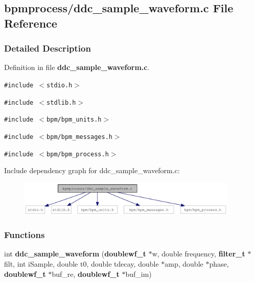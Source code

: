 \subsection{bpmprocess/ddc\_\-sample\_\-waveform.c File Reference}
\label{ddc__sample__waveform_8c}


\subsubsection{Detailed Description}


Definition in file {\bf ddc\_\-sample\_\-waveform.c}.

{\tt \#include $<$stdio.h$>$}\par
{\tt \#include $<$stdlib.h$>$}\par
{\tt \#include $<$bpm/bpm\_\-units.h$>$}\par
{\tt \#include $<$bpm/bpm\_\-messages.h$>$}\par
{\tt \#include $<$bpm/bpm\_\-process.h$>$}\par


Include dependency graph for ddc\_\-sample\_\-waveform.c:\nopagebreak
\begin{figure}[H]
\begin{center}
\leavevmode
\includegraphics[width=297pt]{ddc__sample__waveform_8c__incl}
\end{center}
\end{figure}
\subsubsection*{Functions}
\begin{CompactItemize}
\item 
int {\bf ddc\_\-sample\_\-waveform} ({\bf doublewf\_\-t} $\ast$w, double frequency, {\bf filter\_\-t} $\ast$filt, int iSample, double t0, double tdecay, double $\ast$amp, double $\ast$phase, {\bf doublewf\_\-t} $\ast$buf\_\-re, {\bf doublewf\_\-t} $\ast$buf\_\-im)
\end{CompactItemize}
